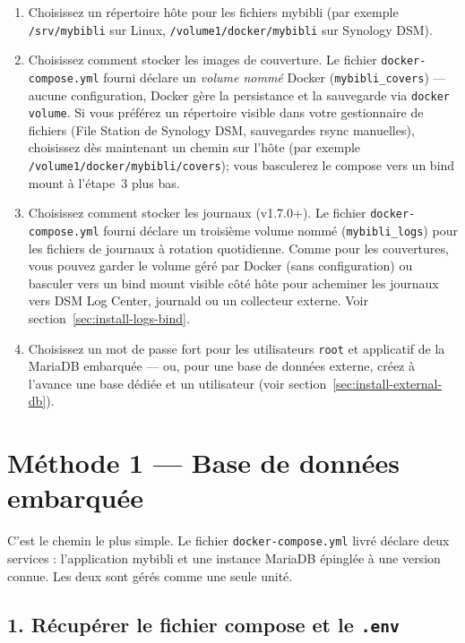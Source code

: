 \begin{enumerate}
  \item Choisissez un répertoire hôte pour les fichiers mybibli
        (par exemple \texttt{/srv/mybibli} sur Linux,
        \texttt{/volume1/docker/mybibli} sur Synology DSM).
  \item Choisissez comment stocker les images de
        couverture. Le fichier
        \texttt{docker-compose.yml} fourni déclare un \emph{volume
        nommé} Docker (\texttt{mybibli\_covers}) — aucune
        configuration, Docker gère la persistance et la sauvegarde via
        \texttt{docker volume}. Si vous préférez un répertoire visible
        dans votre gestionnaire de fichiers (File Station de Synology
        DSM, sauvegardes rsync manuelles), choisissez dès maintenant
        un chemin sur l'hôte (par exemple
        \texttt{/volume1/docker/mybibli/covers}); vous basculerez le
        compose vers un bind mount à l'étape~3 plus bas.
  \item Choisissez comment stocker les
        journaux (v1.7.0+). Le fichier
        \texttt{docker-compose.yml} fourni déclare un troisième volume
        nommé (\texttt{mybibli\_logs}) pour les fichiers de journaux
        à rotation quotidienne. Comme pour les couvertures, vous
        pouvez garder le volume géré par Docker (sans configuration)
        ou basculer vers un bind mount visible côté hôte pour
        acheminer les journaux vers DSM Log Center, journald ou un
        collecteur externe. Voir
        section~\ref{sec:install-logs-bind}.
  \item Choisissez un mot de passe fort pour les utilisateurs
        \texttt{root} et applicatif de la MariaDB embarquée — ou,
        pour une base de données externe, créez à l'avance une base
        dédiée et un utilisateur (voir
        section~\ref{sec:install-external-db}).
\end{enumerate}

\section{Méthode 1 — Base de données embarquée}\label{sec:install-bundled}

C'est le chemin le plus simple. Le fichier \texttt{docker-compose.yml}
livré déclare deux services : l'application mybibli et une instance
MariaDB épinglée à une version connue. Les deux sont gérés comme une
seule unité.

\subsection*{1. Récupérer le fichier compose et le \texttt{.env}}

